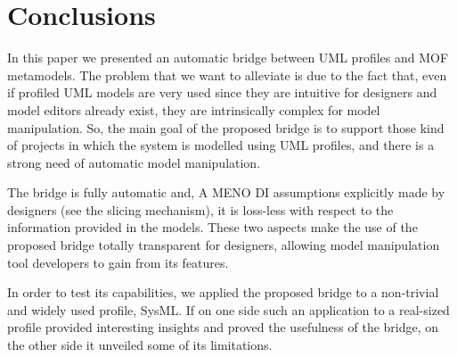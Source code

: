 \section{Conclusions}\label{sec:conclusion}
In this paper we presented an automatic bridge between UML profiles and MOF metamodels.
The problem that we want to alleviate is due to the fact that, even if profiled UML models are very used since they are intuitive for designers and model editors already exist, 
they are intrinsically complex for model manipulation.
So, the main goal of the proposed bridge is to support those kind of projects in which the system is modelled using UML profiles, and there is a strong need of automatic model manipulation.

The bridge is fully automatic and, A MENO DI assumptions explicitly made by designers 
(see the slicing mechanism), it is loss-less with respect to the information provided in the models. 
These two aspects make the use of the proposed bridge totally transparent for designers, allowing
model manipulation tool developers to gain from its features.

In order to test its capabilities, we applied the proposed bridge to a non-trivial and widely used profile,
SysML. If on one side such an application to a real-sized profile provided interesting insights and proved the usefulness of the bridge, on the other side it unveiled some of its limitations.

\ivano{} 



